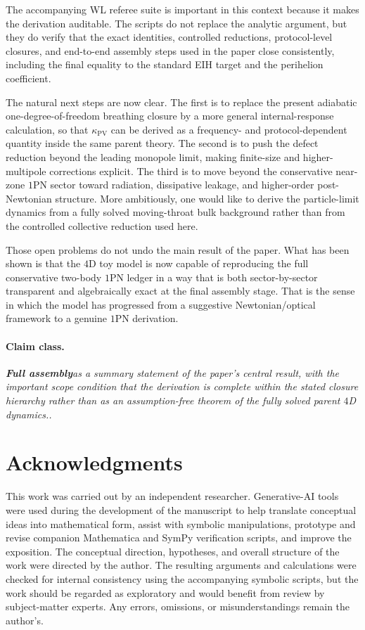 \documentclass[11pt]{article}
\newcommand{\kPV}{\kappa_{\mathrm{PV}}}
\newcommand{\FullMatch}{\textbf{Full assembly}}
\newcommand{\claimclass}[1]{\paragraph{Claim class.}\emph{#1.}}
\begin{document}
The accompanying WL referee suite is important in this context because it makes the
derivation auditable. The scripts do not replace the analytic argument, but they do verify
that the exact identities, controlled reductions, protocol-level closures, and end-to-end
assembly steps used in the paper close consistently, including the final equality to the
standard EIH target and the perihelion coefficient.

The natural next steps are now clear. The first is to replace the present adiabatic
one-degree-of-freedom breathing closure by a more general internal-response calculation,
so that \(\kPV\) can be derived as a frequency- and protocol-dependent quantity inside the
same parent theory. The second is to push the defect reduction beyond the leading monopole
limit, making finite-size and higher-multipole corrections explicit. The third is to move
beyond the conservative near-zone \(1\)PN sector toward radiation, dissipative leakage,
and higher-order post-Newtonian structure. More ambitiously, one would like to derive the
particle-limit dynamics from a fully solved moving-throat bulk background rather than from
the controlled collective reduction used here.

Those open problems do not undo the main result of the paper. What has been shown is that
the \(4\)D toy model is now capable of reproducing the full conservative two-body \(1\)PN
ledger in a way that is both sector-by-sector transparent and algebraically exact at the
final assembly stage. That is the sense in which the model has progressed from a
suggestive Newtonian/optical framework to a genuine \(1\)PN derivation.

\claimclass{\FullMatch as a summary statement of the paper's central result, with the
important scope condition that the derivation is complete within the stated closure
hierarchy rather than as an assumption-free theorem of the fully solved parent \(4\)D
dynamics.}

\section*{Acknowledgments}
This work was carried out by an independent researcher. Generative-AI tools were used
during the development of the manuscript to help translate conceptual ideas into
mathematical form, assist with symbolic manipulations, prototype and revise companion
Mathematica and SymPy verification scripts, and improve the exposition. The conceptual
direction, hypotheses, and overall structure of the work were directed by the author. The
resulting arguments and calculations were checked for internal consistency using the
accompanying symbolic scripts, but the work should be regarded as exploratory and would
benefit from review by subject-matter experts. Any errors, omissions, or misunderstandings
remain the author's.
\end{document}
